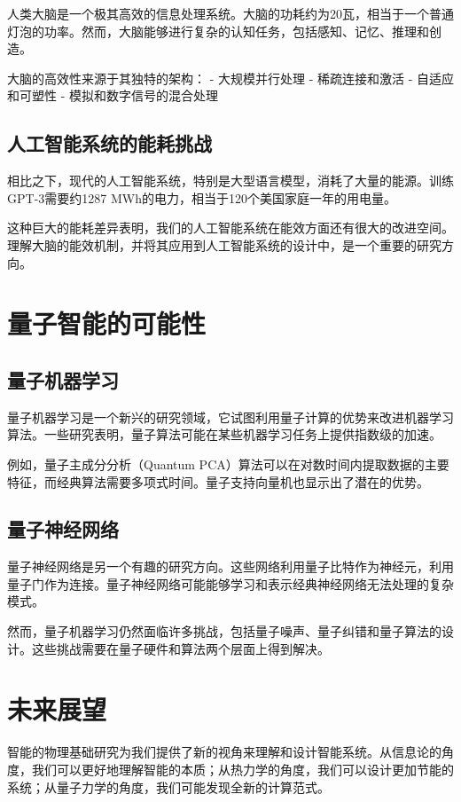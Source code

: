 人类大脑是一个极其高效的信息处理系统。大脑的功耗约为20瓦，相当于一个普通灯泡的功率。然而，大脑能够进行复杂的认知任务，包括感知、记忆、推理和创造。

大脑的高效性来源于其独特的架构：
- 大规模并行处理
- 稀疏连接和激活
- 自适应和可塑性
- 模拟和数字信号的混合处理

\subsection{人工智能系统的能耗挑战}

相比之下，现代的人工智能系统，特别是大型语言模型，消耗了大量的能源。训练GPT-3需要约1287 MWh的电力，相当于120个美国家庭一年的用电量。

这种巨大的能耗差异表明，我们的人工智能系统在能效方面还有很大的改进空间。理解大脑的能效机制，并将其应用到人工智能系统的设计中，是一个重要的研究方向。

\section{量子智能的可能性}

\subsection{量子机器学习}

量子机器学习是一个新兴的研究领域，它试图利用量子计算的优势来改进机器学习算法。一些研究表明，量子算法可能在某些机器学习任务上提供指数级的加速。

例如，量子主成分分析（Quantum PCA）算法可以在对数时间内提取数据的主要特征，而经典算法需要多项式时间。量子支持向量机也显示出了潜在的优势。

\subsection{量子神经网络}

量子神经网络是另一个有趣的研究方向。这些网络利用量子比特作为神经元，利用量子门作为连接。量子神经网络可能能够学习和表示经典神经网络无法处理的复杂模式。

然而，量子机器学习仍然面临许多挑战，包括量子噪声、量子纠错和量子算法的设计。这些挑战需要在量子硬件和算法两个层面上得到解决。

\section{未来展望}

智能的物理基础研究为我们提供了新的视角来理解和设计智能系统。从信息论的角度，我们可以更好地理解智能的本质；从热力学的角度，我们可以设计更加节能的系统；从量子力学的角度，我们可能发现全新的计算范式。

